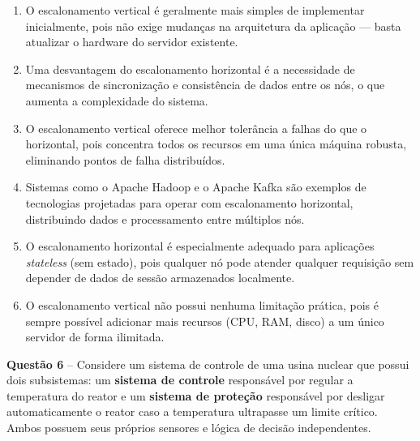 \documentclass[12pt,a4paper]{article}
\begin{document}
\vspace{0.3cm}

\begin{enumerate}[label=\textbf{(\hspace{0.6cm})} ,leftmargin=2cm]

    \item O escalonamento vertical é geralmente mais simples de implementar inicialmente, pois não exige mudanças na arquitetura da aplicação — basta atualizar o hardware do servidor existente.

    \item Uma desvantagem do escalonamento horizontal é a necessidade de mecanismos de sincronização e consistência de dados entre os nós, o que aumenta a complexidade do sistema.

    \item O escalonamento vertical oferece melhor tolerância a falhas do que o horizontal, pois concentra todos os recursos em uma única máquina robusta, eliminando pontos de falha distribuídos.

    \item Sistemas como o Apache Hadoop e o Apache Kafka são exemplos de tecnologias projetadas para operar com escalonamento horizontal, distribuindo dados e processamento entre múltiplos nós.

    \item O escalonamento horizontal é especialmente adequado para aplicações \textit{stateless} (sem estado), pois qualquer nó pode atender qualquer requisição sem depender de dados de sessão armazenados localmente.

    \item O escalonamento vertical não possui nenhuma limitação prática, pois é sempre possível adicionar mais recursos (CPU, RAM, disco) a um único servidor de forma ilimitada.

\end{enumerate}

\vspace{0.5cm}

\textbf{Questão 6} -- Considere um sistema de controle de uma usina nuclear que possui dois subsistemas: um \textbf{sistema de controle} responsável por regular a temperatura do reator e um \textbf{sistema de proteção} responsável por desligar automaticamente o reator caso a temperatura ultrapasse um limite crítico. Ambos possuem seus próprios sensores e lógica de decisão independentes.
\end{document}
